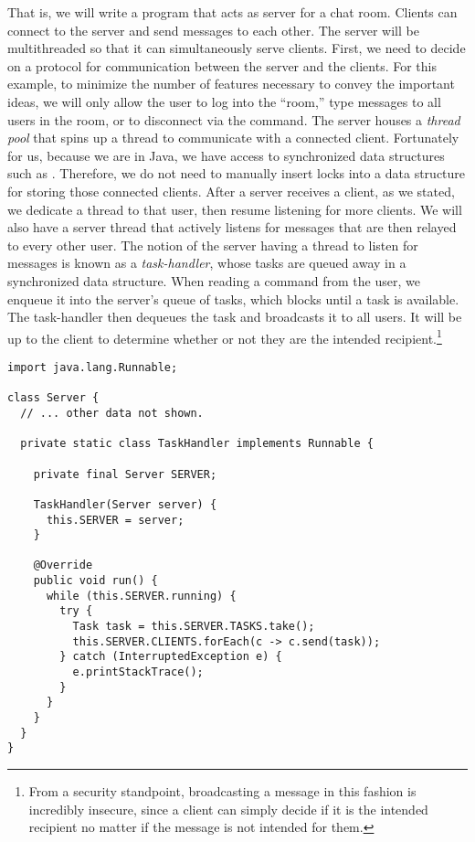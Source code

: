 That is, we will write a program that acts as server for a chat room. 
Clients can connect to the server and send messages to each other. 
The server will be multithreaded so that it can simultaneously serve clients. 
First, we need to decide on a protocol for communication between the server and the clients. 
For this example, to minimize the number of features necessary to convey the important ideas, we will only allow the user to log into the ``room,'' type messages to all users in the room, or to disconnect via the  command. 
The server houses a \emph{thread pool} that spins up a thread to communicate with a connected client. 
Fortunately for us, because we are in Java, we have access to synchronized data structures such as . 
Therefore, we do not need to manually insert locks into a data structure for storing those connected clients. 
After a server receives a client, as we stated, we dedicate a thread to that user, then resume listening for more clients.
We will also have a server thread that actively listens for messages that are then relayed to every other user. 
The notion of the server having a thread to listen for messages is known as a \emph{task-handler}, whose tasks are queued away in a synchronized  data structure. 
When reading a command from the user, we enqueue it into the server's queue of tasks, which blocks until a task is available. 
The task-handler then dequeues the task and broadcasts it to all users. 
It will be up to the client to determine whether or not they are the intended recipient.\footnote{From a security standpoint, broadcasting a message in this fashion is incredibly insecure, since a client can simply decide if it is the intended recipient no matter if the message is not intended for them.}

\begin{lstlisting}[language=MyJava]
import java.lang.Runnable;

class Server {
  // ... other data not shown.

  private static class TaskHandler implements Runnable {

    private final Server SERVER;

    TaskHandler(Server server) { 
      this.SERVER = server; 
    }

    @Override
    public void run() {
      while (this.SERVER.running) {
        try {
          Task task = this.SERVER.TASKS.take();
          this.SERVER.CLIENTS.forEach(c -> c.send(task));
        } catch (InterruptedException e) { 
          e.printStackTrace(); 
        }
      }
    }
  }
}
\end{lstlisting}

